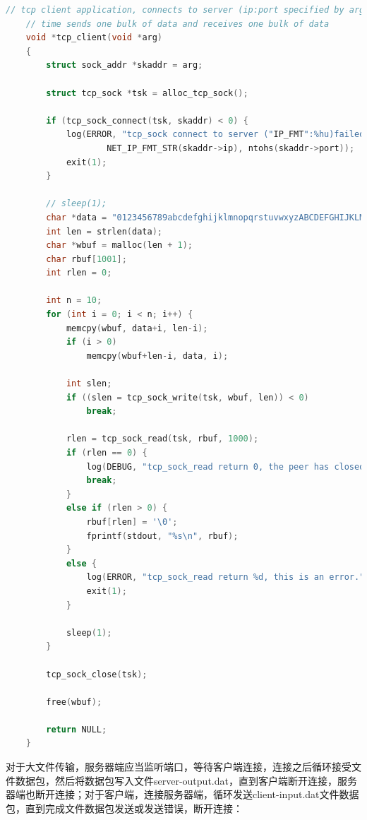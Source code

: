 \documentclass[UTF8]{report}
\begin{document}
\begin{lstlisting}[language=C]
    // tcp client application, connects to server (ip:port specified by arg), each
    // time sends one bulk of data and receives one bulk of data 
    void *tcp_client(void *arg)
    {
        struct sock_addr *skaddr = arg;
    
        struct tcp_sock *tsk = alloc_tcp_sock();
    
        if (tcp_sock_connect(tsk, skaddr) < 0) {
            log(ERROR, "tcp_sock connect to server ("IP_FMT":%hu)failed.", \
                    NET_IP_FMT_STR(skaddr->ip), ntohs(skaddr->port));
            exit(1);
        }
    
        // sleep(1);
        char *data = "0123456789abcdefghijklmnopqrstuvwxyzABCDEFGHIJKLMNOPQRSTUVWXYZ";
        int len = strlen(data);
        char *wbuf = malloc(len + 1);
        char rbuf[1001];
        int rlen = 0;
    
        int n = 10;
        for (int i = 0; i < n; i++) {
            memcpy(wbuf, data+i, len-i);
            if (i > 0)
                memcpy(wbuf+len-i, data, i);
    
            int slen;
            if ((slen = tcp_sock_write(tsk, wbuf, len)) < 0) 
                break;
    
            rlen = tcp_sock_read(tsk, rbuf, 1000);
            if (rlen == 0) {
                log(DEBUG, "tcp_sock_read return 0, the peer has closed.");
                break;
            }
            else if (rlen > 0) {
                rbuf[rlen] = '\0';
                fprintf(stdout, "%s\n", rbuf);
            }
            else {
                log(ERROR, "tcp_sock_read return %d, this is an error.", rlen);
                exit(1);
            }
    
            sleep(1);
        }
    
        tcp_sock_close(tsk);
    
        free(wbuf);
    
        return NULL;
    }
\end{lstlisting}

对于大文件传输，服务器端应当监听端口，等待客户端连接，连接之后循环接受文件数据包，然后将数据包写入文件server-output.dat，直到客户端断开连接，服务器端也断开连接；对于客户端，连接服务器端，循环发送client-input.dat文件数据包，直到完成文件数据包发送或发送错误，断开连接：
\end{document}
